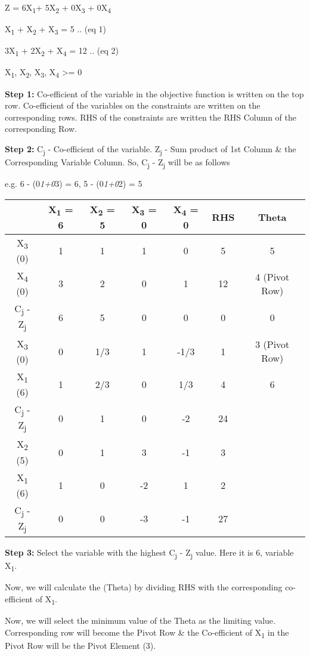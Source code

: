 \documentclass[]{article}
\begin{document}
Z = 6X\textsubscript{1}+ 5X\textsubscript{2} + 0X\textsubscript{3} +
0X\textsubscript{4}

X\textsubscript{1} + X\textsubscript{2} + X\textsubscript{3} = 5 .. (eq
1)

3X\textsubscript{1} + 2X\textsubscript{2} + X\textsubscript{4} = 12 ..
(eq 2)

X\textsubscript{1}, X\textsubscript{2}, X\textsubscript{3},
X\textsubscript{4} \textgreater{}= 0

\textbf{Step 1:} Co-efficient of the variable in the objective function
is written on the top row. Co-efficient of the variables on the
constraints are written on the corresponding rows. RHS of the
constraints are written the RHS Column of the corresponding Row.

\textbf{Step 2:} C\textsubscript{j} - Co-efficient of the variable.
Z\textsubscript{j} - Sum product of 1st Column \& the Corresponding
Variable Column. So, C\textsubscript{j} - Z\textsubscript{j} will be as
follows

e.g. 6 - (0\emph{1+0}3) = 6, 5 - (0\emph{1+0}2) = 5

\begin{longtable}[]{@{}ccccccc@{}}
\toprule
& X\textsubscript{1} = 6 & X\textsubscript{2} = 5 & X\textsubscript{3} =
0 & X\textsubscript{4} = 0 & RHS & Theta\tabularnewline
\midrule
\endhead
X\textsubscript{3} (0) & 1 & 1 & 1 & 0 & 5 & 5\tabularnewline
X\textsubscript{4} (0) & 3 & 2 & 0 & 1 & 12 & 4 (Pivot
Row)\tabularnewline
C\textsubscript{j} - Z\textsubscript{j} & 6 & 5 & 0 & 0 & 0 &
0\tabularnewline
X\textsubscript{3} (0) & 0 & 1/3 & 1 & -1/3 & 1 & 3 (Pivot
Row)\tabularnewline
X\textsubscript{1} (6) & 1 & 2/3 & 0 & 1/3 & 4 & 6\tabularnewline
C\textsubscript{j} - Z\textsubscript{j} & 0 & 1 & 0 & -2 & 24
&\tabularnewline
X\textsubscript{2} (5) & 0 & 1 & 3 & -1 & 3 &\tabularnewline
X\textsubscript{1} (6) & 1 & 0 & -2 & 1 & 2 &\tabularnewline
C\textsubscript{j} - Z\textsubscript{j} & 0 & 0 & -3 & -1 & 27
&\tabularnewline
\bottomrule
\end{longtable}

\textbf{Step 3:} Select the variable with the highest C\textsubscript{j}
- Z\textsubscript{j} value. Here it is 6, variable X\textsubscript{1}.

Now, we will calculate the (Theta) by dividing RHS with the
corresponding co-efficient of X\textsubscript{1}.

Now, we will select the minimum value of the Theta as the limiting
value. Corresponding row will become the Pivot Row \& the Co-efficient
of X\textsubscript{1} in the Pivot Row will be the Pivot Element (3).
\end{document}
